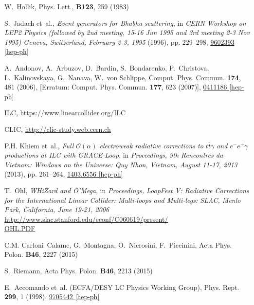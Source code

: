 \documentclass[%
 reprint,
amsmath,
amssymb,
 aps,
 prb,
 floatfix,
]{revtex4-1}
\begin{document}
\begin{thebibliography}{30}
W.~Hollik,  Phys. Lett., \textbf{B123}, 259 (1983)


S.~Jadach et~al., \emph{{Event generators for Bhabha scattering}}, in
  \emph{{CERN Workshop on LEP2 Physics (followed by 2nd meeting, 15-16 Jun 1995
  and 3rd meeting 2-3 Nov 1995) Geneva, Switzerland, February 2-3, 1995}}
  (1996), pp. 229--298,
  \href{http://xxx.lanl.gov/abs/hep-ph/9602393}{9602393 [hep-ph]}

A.~Andonov, A.~Arbuzov, D.~Bardin, S.~Bondarenko, P.~Christova,
  L.~Kalinovskaya, G.~Nanava, W.~von Schlippe, Comput. Phys. Commun.
  \textbf{174}, 481 (2006), [Erratum: Comput. Phys. Commun. {\bf 177}, 623
    (2007)],
  \href{http://xxx.lanl.gov/abs/hep-ph/0411186}{0411186 [hep-ph]}

ILC, \url{https://www.linearcollider.org/ILC}

CLIC, \url{http://clic-study.web.cern.ch}

P.H. Khiem et~al., \emph{{Full $\mathcal{O}(\alpha)$ electroweak radiative
  corrections to $t \bar{t} \gamma$ and $e^-e^+\gamma$ productions at ILC with
  GRACE-Loop}}, in \emph{{Proceedings, 9th Rencontres du Vietnam: Windows on
    the Universe: Quy Nhon, Vietnam, August 11-17, 2013}} (2013), pp. 261--264,
  \href{http://xxx.lanl.gov/abs/hep-ph/1403.6556}{1403.6556 [hep-ph]}

T.~Ohl, \emph{WHiZard and O'Mega}, in \emph{Proceedings, LoopFest V:
  Radiative Corrections for the International Linear Collider: Multi-loops and
  Multi-legs: SLAC, Menlo Park, California, June 19-21, 2006}
\href{http://www.slac.stanford.edu/econf/C060619/present/OHL.PDF}{http://www.slac.stanford.edu/econf/C060619/present/\\OHL.PDF}

C.M. Carloni~Calame, G.~Montagna, O.~Nicrosini, F.~Piccinini, Acta Phys. Polon.
  \textbf{B46}, 2227 (2015)

S.~Riemann, Acta Phys. Polon. \textbf{B46}, 2213 (2015)

E.~Accomando et~al. (ECFA/DESY LC Physics Working Group), Phys. Rept.
\textbf{299}, 1 (1998),
\href{http://xxx.lanl.gov/abs/hep-ph/9705442}{9705442 [hep-ph]}


\end{thebibliography}
\end{document}

